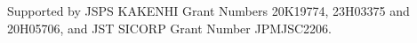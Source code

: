 \documentclass[sigconf,screen]{acmart}
\begin{document}
\begin{sloppy}
\begin{acks}
Supported by JSPS KAKENHI Grant Numbers 20K19774, 23H03375 and 20H05706, and JST SICORP Grant Number JPMJSC2206.
\end{acks}

\balance

%


\end{sloppy}
\end{document}
